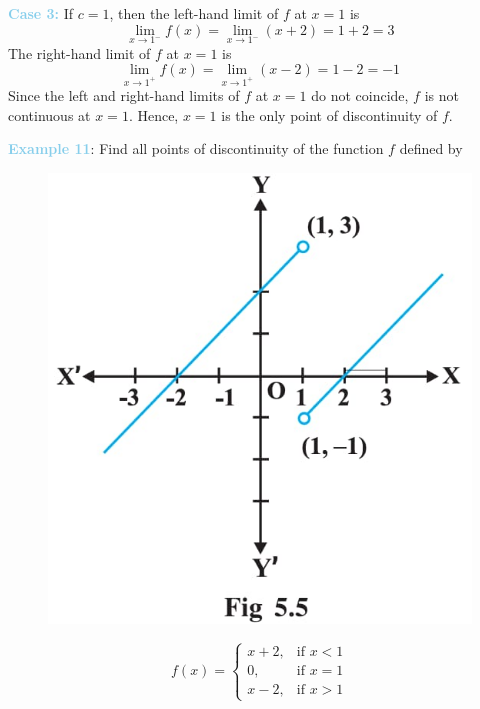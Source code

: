 \documentclass[a4paper,12pt]{article}
\begin{document}
    \noindent \textbf{\textcolor{skyblue}{Case 3:}} If $c = 1$, then the left-hand limit of $f$ at $x = 1$ is
    \[
    \lim\limits_{x \to 1^-} f(x) = \lim\limits_{x \to 1^-} (x+2) = 1+2 = 3
    \]
    \noindent The right-hand limit of $f$ at $x = 1$ is
    \[
    \lim\limits_{x \to 1^+} f(x) = \lim\limits_{x \to 1^+} (x-2) = 1-2 = -1
    \]
    \hspace{10pt} Since the left and right-hand limits of $f$ at $x = 1$ do not coincide, $f$ is not continuous at $x = 1$. Hence, $x = 1$ is the only point of discontinuity of $f$.

\vspace{10pt} %

\noindent \textbf{\textcolor{skyblue}{Example 11}}: Find all points of discontinuity of the function $f$ defined by
  \begin{figure}
    \centering
    \includegraphics[width=1\linewidth]{b.jpg}
    \end{figure}

\[
f(x) =
\begin{cases} 
x+2, & \text{if } x < 1 \\ 
0, & \text{if } x = 1 \\ 
x-2, & \text{if } x > 1
\end{cases}
\]
\end{document}
